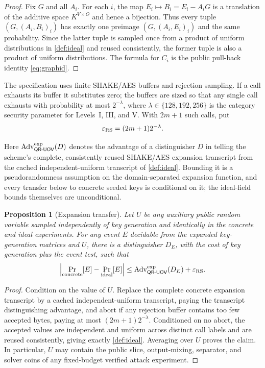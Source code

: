 \documentclass[10pt,a4paper]{article}
\newtheorem{proposition}[theorem]{Proposition}
\newcommand{\QRUOV}{\textsf{QR-UOV}}
\newcommand{\Adv}{\operatorname{Adv}}
\begin{document}
\begin{proof}
Fix $G$ and all $A_i$.  For each $i$, the map $E_i\mapsto B_i=E_i-A_iG$ is a translation of the additive space $K^{V\times O}$ and hence a bijection.  Thus every tuple $(G,(A_i,B_i)_i)$ has exactly one preimage $(G,(A_i,E_i)_i)$ and the same probability.  Since the latter tuple is sampled once from a product of uniform distributions in \cref{def:ideal} and reused consistently, the former tuple is also a product of uniform distributions.  The formula for $C_i$ is the public pull-back identity \eqref{eq:graphid}.
\end{proof}

The specification uses finite SHAKE/AES buffers and rejection sampling. If a call exhausts its buffer it substitutes zero; the buffers are sized so that any single call exhausts with probability at most $2^{-\lambda}$, where $\lambda\in\{128,192,256\}$ is the category security parameter for Levels~I, III, and V. With $2m+1$ such calls, put
\[
\varepsilon_{\rm RS}=(2m+1)2^{-\lambda}.
\]

Here $\Adv^{\rm exp}_{\QRUOV}(D)$ denotes the advantage of a distinguisher $D$ in telling the scheme's complete, consistently reused SHAKE/AES expansion transcript from the cached independent-uniform transcript of \cref{def:ideal}.  Bounding it is a pseudorandomness assumption on the domain-separated expansion function, and every transfer below to concrete seeded keys is conditional on it; the ideal-field bounds themselves are unconditional.

\begin{proposition}[Expansion transfer]\label{prop:transfer}
Let $U$ be any auxiliary public random variable sampled independently of key generation and identically in the concrete and ideal experiments.  For any event $E$ decidable from the expanded key-generation matrices and $U$, there is a distinguisher $D_E$, with the cost of key generation plus the event test, such that
\[
\left|\Pr_{\rm concrete}[E]-\Pr_{\rm ideal}[E]\right|
\le \Adv^{\rm exp}_{\QRUOV}(D_E)+\varepsilon_{\rm RS}.
\]
\end{proposition}

\begin{proof}
Condition on the value of $U$.  Replace the complete concrete expansion transcript by a cached independent-uniform transcript, paying the transcript distinguishing advantage, and abort if any rejection buffer contains too few accepted bytes, paying at most $(2m+1)2^{-\lambda}$.  Conditioned on no abort, the accepted values are independent and uniform across distinct call labels and are reused consistently, giving exactly \cref{def:ideal}.  Averaging over $U$ proves the claim.  In particular, $U$ may contain the public slice, output-mixing, separator, and solver coins of any fixed-budget verified attack experiment.
\end{proof}
\end{document}
